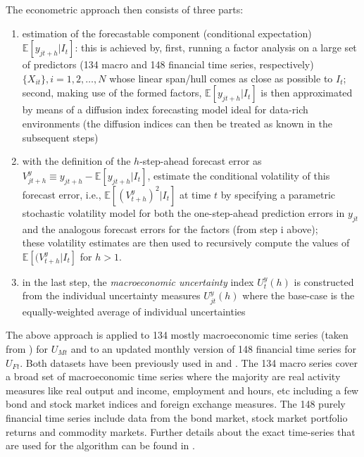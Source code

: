 \documentclass[a4paper,11pt,listof=nochaptergap,oneside,pointednumbers,bibtotoc,bigheadings,liststotoc]{scrbook}
\theoremstyle{mysatz}
\theoremstyle{mydefinition}
\theoremstyle{mytheorem}
\theoremstyle{mybemerkung}
\begin{document}
The econometric approach then consists of three parts:
\begin{enumerate}[i]
	\item estimation of the forecastable component (conditional expectation) $\mathbb{E}[y_{jt+h}|I_t]$: this is achieved by, first, running a factor analysis on a large set of predictors (134 macro and 148 financial time series, respectively) $\{X_{it}\}, i = 1, 2, \dots, N$ whose linear span/hull comes as close as possible to $I_t$; second, making use of the formed factors, $\mathbb{E}[y_{jt+h}|I_t]$ is then approximated by means of a diffusion index forecasting model ideal for data-rich environments (the diffusion indices can then be treated as known in the subsequent steps)
	\item with the definition of the $h$-step-ahead forecast error as $V_{jt+h}^y \equiv y_{jt+h} - \mathbb{E}[y_{jt+h}|I_t]$, \citet{juradoetal:15} estimate the conditional volatility of this forecast error, i.e., $\mathbb{E}[(V_{t+h}^y)^2|I_t]$ at time $t$ by specifying a parametric stochastic volatility model for both the one-step-ahead prediction errors in $y_{jt}$ and the analogous forecast errors for the factors (from step i above); \\
	these volatility estimates are then used to recursively compute the values of $\mathbb{E}[(V_{t+h}^y|I_t]$ for $h > 1$. 
	\item in the last step, the \textit{macroeconomic uncertainty} index $U_t^y(h)$ is constructed from the individual uncertainty measures $U_{jt}^y(h)$ where the base-case is the equally-weighted average of individual uncertainties
\end{enumerate}

The above approach is applied to 134 mostly macroeconomic time series (taken from \citet{mccrackenandng:16}) for $U_{Mt}$ and to an updated monthly version of 148 financial time series for $U_{Ft}$. Both datasets have been previously used in \citet{ludvigsonandng:07} and \citet{juradoetal:15}. The 134 macro series cover a broad set of macroeconomic time series where the majority are real activity measures like real output and income, employment and hours, etc including a few bond and stock market indices and foreign exchange measures. The 148 purely financial time series  include data from the bond market, stock market portfolio returns and commodity markets. Further details about the exact time-series that are used for the algorithm can be found in \citet{ludvigsonetal:18}.
\end{document}
